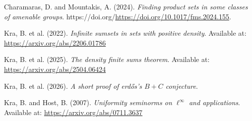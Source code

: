 \documentclass[
  british,
]{article}
\newlength{\cslhangindent}
\newenvironment{CSLReferences}[2] %
 {\begin{list}{}{%
  \setlength{\itemindent}{0pt}
  \setlength{\leftmargin}{0pt}
  \setlength{\parsep}{0pt}
  \ifodd #1
   \setlength{\leftmargin}{\cslhangindent}
   \setlength{\itemindent}{-1\cslhangindent}
  \fi
  \setlength{\itemsep}{#2\baselineskip}}}
 {\end{list}}
\theoremstyle{plain}
\theoremstyle{remark}
\begin{document}
\protect{}\label{refs}
\begin{CSLReferences}{1}{0}
Charamaras, D. and Mountakis, A. (2024). \emph{Finding product sets in
some classes of amenable groups}.
https://doi.org/\url{https://doi.org/10.1017/fms.2024.155}.

Kra, B. et al. (2022). \emph{Infinite sumsets in sets with positive
density}. Available at: \url{https://arxiv.org/abs/2206.01786}

Kra, B. et al. (2025). \emph{The density finite sums theorem}. Available
at: \url{https://arxiv.org/abs/2504.06424}

Kra, B. et al. (2026). \emph{A short proof of erdős's \(B+C\)
conjecture}.

Kra, B. and Host, B. (2007). \emph{Uniformity seminorms on
\(\ell^\infty\) and applications}. Available at:
\url{https://arxiv.org/abs/0711.3637}

\end{CSLReferences}
\end{document}

